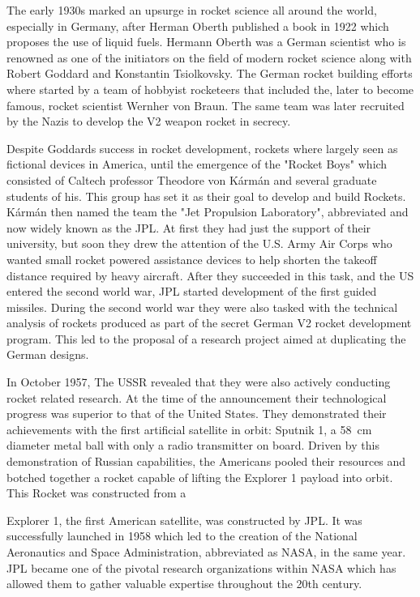 The early 1930s marked an upsurge in rocket science all around the world, especially in Germany, after Herman Oberth published a book in 1922 which proposes the use of liquid fuels. Hermann Oberth was a German scientist who is renowned as one of the initiators on the field of modern rocket science along with Robert Goddard and Konstantin Tsiolkovsky. The German rocket building efforts where started by a team of hobbyist rocketeers that included the, later to become famous, rocket scientist Wernher von Braun. The same team was later recruited by the Nazis to develop the V2 weapon rocket in secrecy.

Despite Goddards success in rocket development, rockets where largely seen as fictional devices in America, until the emergence of the "Rocket Boys" which consisted of Caltech professor Theodore von Kármán and several graduate students of his. This group has set it as their goal to develop and build Rockets. Kármán then named the team the "Jet Propulsion Laboratory", abbreviated and now widely known as the JPL. At first they had just the support of their university, but soon they drew the attention of the U.S. Army Air Corps who wanted small rocket powered assistance devices to help shorten the takeoff distance required by heavy aircraft. After they succeeded in this task, and the US entered the second world war, JPL started development of the first guided missiles. During the second world war they were also tasked with the technical analysis of rockets produced as part of the secret German V2 rocket development program. This led to the proposal of a research project aimed at duplicating the German designs.

In October 1957, The USSR revealed that they were also actively conducting rocket related research. At the time of the announcement their technological progress was superior to that of the United States. 
They demonstrated their achievements with the first artificial satellite in orbit: Sputnik 1, a \SI{58}{\centi\meter} diameter metal ball with only a radio transmitter on board. Driven by this demonstration of Russian capabilities, the Americans pooled their resources and botched together a rocket capable of lifting the Explorer 1 payload into orbit. This Rocket was constructed from a 

Explorer 1, the first American satellite, was constructed by JPL. It was successfully launched in 1958 which led to the creation of the National Aeronautics and Space Administration, abbreviated as NASA, in the same year. JPL became one of the pivotal research organizations within NASA which has allowed them to gather valuable expertise throughout the 20th century. 